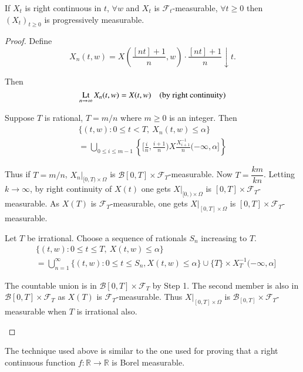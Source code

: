 \begin{theorem*}
If $X_{t}$ is right continuous in $t$, $\forall w$ and $X_{t}$ is
$\mathscr{F}_{t}$-measurable, $\forall t\geq 0$ then $(X_{t})_{t\geq
  0}$ is progressively measurable.
\end{theorem*}

\begin{proof}
Define
$$
X_{n}(t,w)=X\left(\frac{[nt]+1}{n},w\right)\cdot
\frac{[nt]+1}{n}\downarrow t.
$$

Then
$$
\operatorname*{Lt}\limits_{n\to \infty}X_{n}(t,w)=X(t,w)\quad \text{(by right continuity)}
$$\pageoriginale

\setcounter{step}{0}
\begin{step}%
Suppose $T$ is rational, $T=m/n$ where $m\geq 0$ is an integer. Then
\begin{gather*}
\{(t,w):0\leq t<T,\ X_{n}(t,w)\leq \alpha\}\\
=\bigcup\limits_{0\leq i\leq m-1}\left\{\Big[\frac{i}{n},\frac{i+1}{n}\Big)X\frac{X^{-1}_{i+1}}{n}(-\infty,\alpha]\right\}
\end{gather*}

Thus if $T=m/n$, $X_{n}|_{[0,T)\times \Omega}$ is
  $\mathscr{B}[0,T]\times \mathscr{F}_{T}$-measurable. Now
  $T=\dfrac{km}{kn}$. Letting $k\to \infty$, by right continuity of
  $X(t)$ one gets $X|_{[0,)\times \Omega}$ is $[0,T]\times
    \mathscr{F}_{T}$-measurable. As $X(T)$ is
    $\mathscr{F}_{T}$-measurable, one gets $X|_{[0,T]\times\Omega}$ is
    $[0,T]\times \mathscr{F}_{T}$-measurable. 
\end{step}

\begin{step}%
Let $T$ be irrational. Choose a sequence of rationals $S_{n}$
increasing to $T$.
\begin{align*}
& \{(t,w):0\leq t\leq T,\ X(t,w)\leq \alpha\}\\
& =\bigcup\limits^{\infty}_{n=1}\{(t,w):0\leq t\leq S_{n}, X(t,w)\leq
  \alpha\}\cup \{T\}\times X^{-1}_{T}(-\infty,\alpha]
\end{align*}

The countable union is in $\mathscr{B}[0,T]\times \mathscr{F}_{T}$ by
Step 1. The second member is also in $\mathscr{B}[0,T]\times
\mathscr{F}_{T}$ as $X(T)$ is $\mathscr{F}_{T}$-measurable. Thus
$X|_{[0,T]\times \Omega}$ is $\mathscr{B}_{[0,T]}\times
\mathscr{F}_{T}$-measurable when $T$ is irrational also.
\end{step}
\end{proof}

\begin{remark*}
The technique used above is similar to the one used for proving that a
right continuous function $f:\mathbb{R}\to \mathbb{R}$ is Borel measurable.
\end{remark*}


